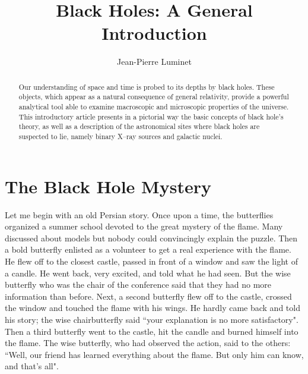 \documentclass{lamuphys}
\begin{document}
\title{Black Holes: A General Introduction}
\author{Jean-Pierre Luminet} 
\maketitle
\label{chap:luminet}

\begin{abstract}
Our understanding of space and time is probed to its depths by black holes.
These objects, which appear as a natural consequence of general relativity,
provide a powerful analytical tool able to examine macroscopic and
microscopic properties of the universe. This introductory article presents
in a pictorial way the basic concepts of black hole's theory, as well as a
description of the astronomical sites where black holes are suspected to
lie, namely binary X--ray sources and galactic nuclei.
\end{abstract}

\section {The Black Hole Mystery}

Let me begin with an old Persian story. Once upon a time, the butterflies
organized a summer school devoted to the great
mystery of the flame. Many discussed about models but nobody could
convincingly explain the puzzle. Then a bold butterfly enlisted as a
volunteer to get a real experience with the flame. He flew off to the
closest castle, passed in front of a window and saw the light of a candle. He
went back, very excited, and told what he had seen. But the wise 
butterfly who was the chair of the conference said that they had no
more information than before.
Next, a second butterfly flew off to the castle, crossed the window and
touched the flame with his wings. He hardly came back and told his story; the wise
chairbutterfly said ``your explanation is no more satisfactory". Then a third
butterfly went to the castle, hit the candle and burned himself into the
flame. The wise butterfly, who had observed the action, said to the others:
``Well, our friend has learned everything about the flame. But only him can
know, and that's all".
\end{document}
